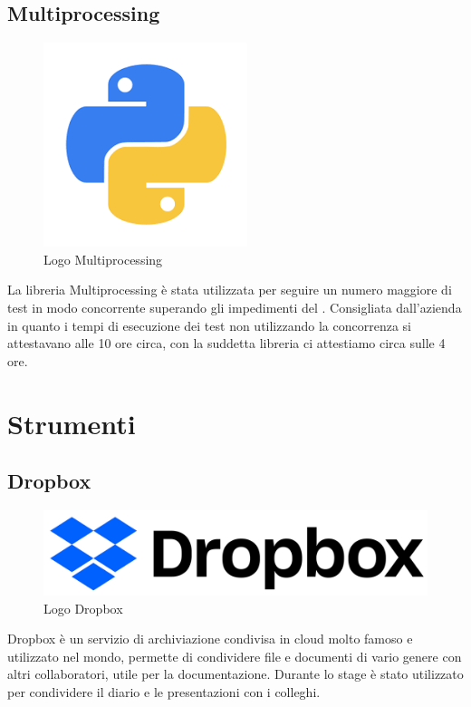 \subsection{Multiprocessing}
\begin{figure}[H]
	\begin{center} \includegraphics[scale=0.5]{figures/python}
		\caption[Logo Multiprocessing]{Logo Multiprocessing}  
	\end{center}
\end{figure}
La libreria Multiprocessing è stata utilizzata per seguire un numero maggiore di test in modo concorrente superando gli impedimenti del . Consigliata dall'azienda in quanto i tempi di esecuzione dei test non utilizzando la concorrenza si attestavano alle 10 ore circa, con la suddetta libreria ci attestiamo circa sulle 4 ore.

\section{Strumenti}
\subsection{Dropbox}
\begin{figure}[H]
	\begin{center} \includegraphics[scale=0.2]{figures/dropbox_2017_logo}
		\caption[Logo Dropbox]{Logo Dropbox}  
	\end{center}
\end{figure}
Dropbox è un servizio di archiviazione condivisa in cloud molto famoso e utilizzato nel mondo, permette di condividere file e documenti di vario genere con altri collaboratori, utile per la documentazione. Durante lo stage è stato utilizzato per condividere il diario e le presentazioni con i colleghi.

